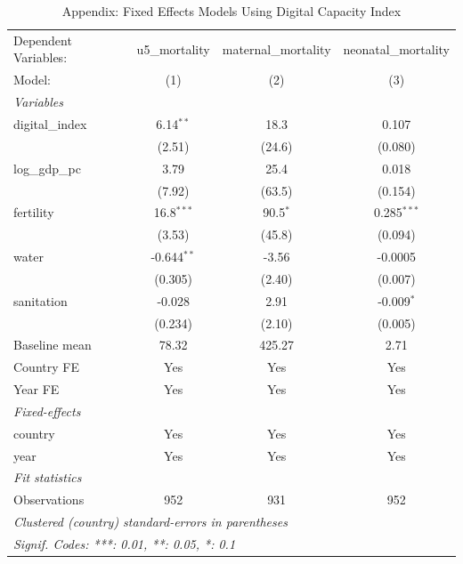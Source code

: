 \begin{table}[htbp]
   \caption{\label{tab:appendix_digital_index} Appendix: Fixed Effects Models Using Digital Capacity Index}
   \centering
   \begin{tabular}{lccc}
      \tabularnewline \midrule \midrule
      Dependent Variables: & u5\_mortality  & maternal\_mortality  & neonatal\_mortality\\   
      Model:               & (1)            & (2)                  & (3)\\  
      \midrule
      \emph{Variables}\\
      digital\_index       & 6.14$^{**}$    & 18.3                 & 0.107\\   
                           & (2.51)         & (24.6)               & (0.080)\\   
      log\_gdp\_pc         & 3.79           & 25.4                 & 0.018\\   
                           & (7.92)         & (63.5)               & (0.154)\\   
      fertility            & 16.8$^{***}$   & 90.5$^{*}$           & 0.285$^{***}$\\   
                           & (3.53)         & (45.8)               & (0.094)\\   
      water                & -0.644$^{**}$  & -3.56                & -0.0005\\   
                           & (0.305)        & (2.40)               & (0.007)\\   
      sanitation           & -0.028         & 2.91                 & -0.009$^{*}$\\   
                           & (0.234)        & (2.10)               & (0.005)\\   
      Baseline mean        & 78.32          & 425.27               & 2.71\\  
      Country FE           & Yes            & Yes                  & Yes\\  
      Year FE              & Yes            & Yes                  & Yes\\  
      \midrule
      \emph{Fixed-effects}\\
      country              & Yes            & Yes                  & Yes\\  
      year                 & Yes            & Yes                  & Yes\\  
      \midrule
      \emph{Fit statistics}\\
      Observations         & 952            & 931                  & 952\\  
      \midrule \midrule
      \multicolumn{4}{l}{\emph{Clustered (country) standard-errors in parentheses}}\\
      \multicolumn{4}{l}{\emph{Signif. Codes: ***: 0.01, **: 0.05, *: 0.1}}\\
   \end{tabular}
\end{table}
